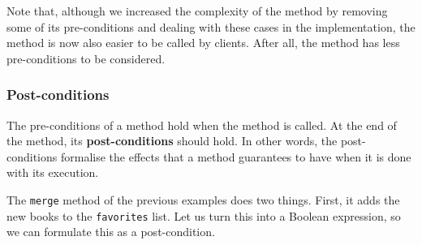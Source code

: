 Note that, although we increased the complexity of the method by
removing some of its pre-conditions and dealing with these cases in the
implementation, the method is now also easier to be called by clients.
After all, the method has less pre-conditions to be considered.

\hypertarget{post-conditions}{%
\subsubsection{Post-conditions}\label{post-conditions}}

The pre-conditions of a method hold when the method is called. At the
end of the method, its \textbf{post-conditions} should hold. In other
words, the post-conditions formalise the effects that a method
guarantees to have when it is done with its execution.

The \texttt{merge} method of the previous examples does two things.
First, it adds the new books to the \texttt{favorites} list. Let us turn
this into a Boolean expression, so we can formulate this as a
post-condition.

\begin{Shaded}
\begin{Highlighting}[]
 

    \NormalTok{(}\NormalTok{\textless{}}
\NormalTok{ : }\NormalTok{;}
\NormalTok{ : }\NormalTok{;}

    \NormalTok{\textless{}}

    \NormalTok{()) \{}
\NormalTok{    \}}

\NormalTok{;}
\NormalTok{  \}}
\NormalTok{\}}
\end{Highlighting}
\end{Shaded}

